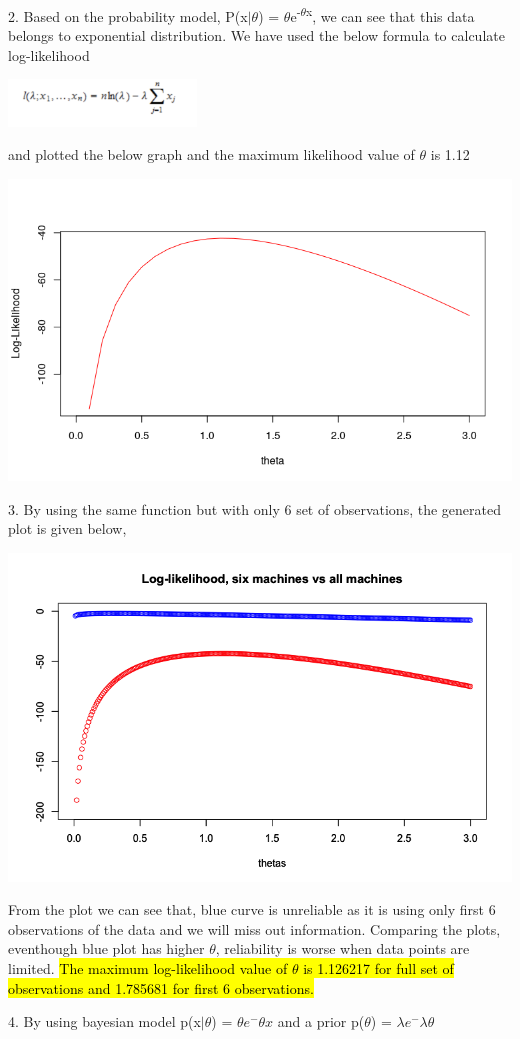 \documentclass[a4paper,10pt]{article}
\begin{document}
2. Based on the probability model, P(x$|$$\theta$) = $\theta$e\textsuperscript{-$\theta$x}, we can see that
this data belongs to exponential distribution. We have used the below formula to calculate log-likelihood
\par
\begin{center}
	\includegraphics[width=50mm,scale=0.10]{Log-likelihood-formula.png}
\end{center}
and plotted the below graph and the maximum likelihood value of $\theta$ is 1.12 \par
\begin{center}
	\includegraphics[width=.5\textwidth]{log-likelihood-full-data.png}
\end{center}
3. By using the same function but with only 6 set of observations, the generated plot is given below,\par
\begin{center}
	\includegraphics[width=.5\textwidth]{Log-likelihood.png}
\end{center}
From the plot we can see that, blue curve is unreliable as it is using only first 6 observations of the data and we will
miss out information. Comparing the plots, eventhough blue plot has higher $\theta$, reliability is worse when data points
are limited. \hl{The maximum log-likelihood value of $\theta$ is 1.126217 for full set of observations and 1.785681 for first 6
observations.}\par
\vspace{0.5cm}
\par
4. By using bayesian model p(x$|$$\theta$) = $\theta$$e^-$$\theta$$x$ and a prior p($\theta$) = $\lambda$$e^-$$\lambda$$\theta$
\end{document}
